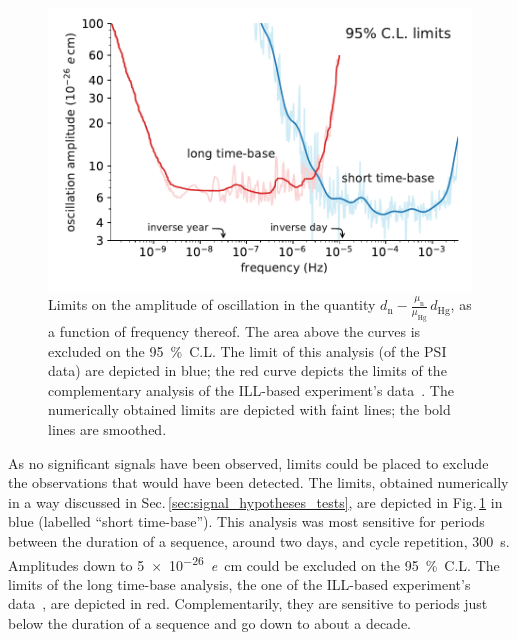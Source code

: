 \begin{figure}
  \centering
  \includegraphics[width=\linewidth]{gfx/axions/psi_ill_1e-26ecm.pdf}
  \caption{Limits on the amplitude of oscillation in the quantity $d_\text{n} - \frac{\mu_\text{n}}{\mu_\text{Hg}} \, d_\text{Hg}$, as a function of frequency thereof. The area above the curves is excluded on the \SI{95}{\percent}~C.L.
  The limit of this analysis (of the PSI data) are depicted in blue; the red curve depicts the limits of the complementary analysis of the ILL-based experiment's data~\cite{AyresThesis,PhysRevX.7.041034}.
  The numerically obtained limits are depicted with faint lines; the bold lines are smoothed.}
\label{fig:axions_limits_nEDM}
\end{figure}

As no significant signals have been observed, limits could be placed to exclude the observations that would have been detected.
The limits, obtained numerically in a way discussed in Sec.\,\ref{sec:signal_hypotheses_tests}, are depicted in Fig.\,\ref{fig:axions_limits_nEDM} in blue (labelled ``short time-base'').
This analysis was most sensitive for periods between the duration of a sequence, around two days, and cycle repetition, \SI{300}{\second}.
Amplitudes down to \SI{5e-26}{\elementarycharge\centi\meter} could be excluded on the \SI{95}{\percent}~C.L.
The limits of the long time-base analysis, the one of the ILL-based experiment's data~\cite{AyresThesis,PhysRevX.7.041034}, are depicted in red.
Complementarily, they are sensitive to periods just below the duration of a sequence and go down to about a decade.

